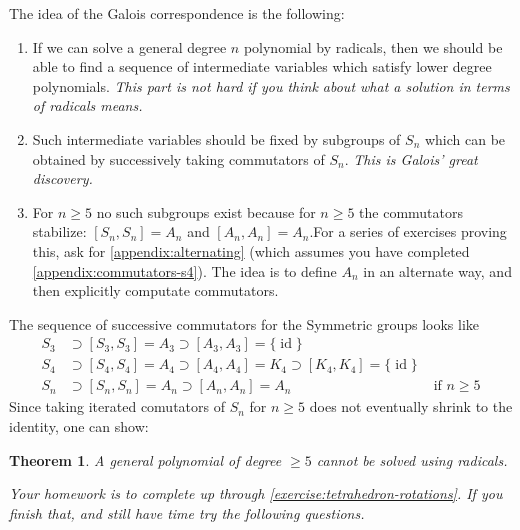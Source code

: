 \documentclass[reqno, 12pt, letter]{article}
\theoremstyle{plain}
\newtheorem{theorem}{Theorem}[section]
\theoremstyle{definition}
\theoremstyle{remark}
\numberwithin{equation}{section}
\DeclareMathOperator\id{id}
\begin{document}
			The idea of the Galois correspondence is the following:
			\begin{enumerate}
				\item If we can solve a general degree $ n$ polynomial by radicals, then we should be able to find a sequence of intermediate variables which satisfy lower degree polynomials. 
				\emph{This part is not hard if you think about what a solution in terms of radicals means.}
				\item Such intermediate variables should be fixed by subgroups of $ S_n$ which can be obtained by successively taking commutators of $ S_n$. \emph{This is Galois' great discovery.} 
				\item For $ n \ge 5$ no such subgroups exist because for $ n \ge 5$ the commutators stabilize: $[S_n, S_n] = A_n$ and $ [A_n, A_n] = A_n$.For a series of exercises proving this, ask for \autoref{appendix:alternating} (which assumes you have completed \autoref{appendix:commutators-s4}). The idea is to define $A_n$ in an alternate way, and then explicitly computate commutators.
			\end{enumerate}
      
      The sequence of successive commutators for the Symmetric groups looks like
      \begin{align*}
	      S_3 &\supset [S_3, S_3] = A_3 \supset [A_3, A_3] = \{ \id \}  &\\
		S_4 &\supset [S_4, S_4] = A_4 \supset [A_4, A_4] = K_4 \supset [K_4, K_4] = \{ \id \} & \\
		S_n &\supset [S_n, S_n] = A_n \supset [A_n, A_n] = A_n      & \text{ if } n \geq 5
\end{align*}
	Since taking iterated comutators of $S_n$ for $n \geq 5$ does not eventually shrink to the identity,
	one can show:
			\begin{theorem}
				A general polynomial of degree $ \ge 5$ cannot be solved using radicals.
			\end{theorem}

{\it Your homework is to complete up through \autoref{exercise:tetrahedron-rotations}. If you finish that, and still have time try the following questions.}
\end{document}
